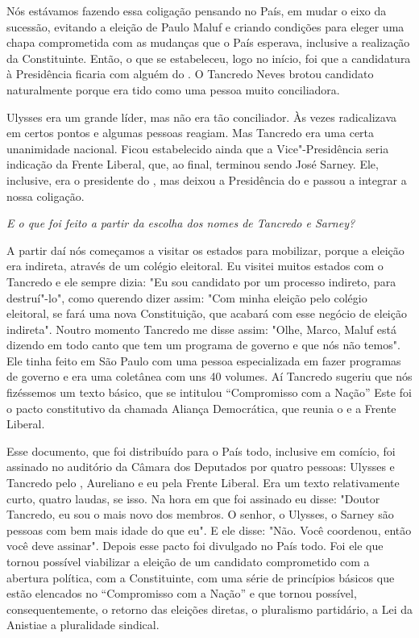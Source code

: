 Nós estávamos fazendo essa coligação pensando no País, em mudar o eixo
da sucessão, evitando a eleição de Paulo Maluf e criando condições para
eleger uma chapa comprometida com as mudanças que o País esperava,
inclusive a realização da Constituinte. Então, o que se estabeleceu,
logo no início, foi que a candidatura à Presidência ficaria com alguém
do . O Tancredo Neves brotou candidato naturalmente porque era tido
como uma pessoa muito conciliadora.

Ulysses era um grande líder, mas não era tão conciliador. Às vezes
radicalizava em certos pontos e algumas pessoas reagiam. Mas Tancredo
era uma certa unanimidade nacional. Ficou estabelecido ainda que a
Vice"-Presidência seria indicação da Frente Liberal, que, ao final,
terminou sendo José Sarney. Ele, inclusive, era o presidente do , mas
deixou a Presidência do  e passou a integrar a nossa coligação.

\medskip

\emph{E o que foi feito a partir da escolha dos nomes de Tancredo e
Sarney? }

A partir daí nós começamos a visitar os estados para
mobilizar, porque a eleição era indireta, através de um colégio
eleitoral. Eu visitei muitos estados com o Tancredo e ele sempre dizia:
"Eu sou candidato por um processo indireto, para destruí"-lo", como
querendo dizer assim: "Com minha eleição pelo colégio eleitoral, se fará
uma nova Constituição, que acabará com esse negócio de eleição
indireta". Noutro momento Tancredo me disse assim: "Olhe, Marco, Maluf
está dizendo em todo canto que tem um programa de governo e que nós não
temos". Ele tinha feito em São Paulo com uma pessoa especializada em
fazer programas de governo e era uma coletânea com uns 40 volumes. Aí
Tancredo sugeriu que nós fizéssemos um texto básico, que se intitulou
``Compromisso com a Nação'' Este foi o pacto constitutivo da chamada
Aliança Democrática, que reunia o  e a Frente Liberal.

Esse documento, que foi distribuído para o País todo, inclusive em
comício, foi assinado no auditório da Câmara dos Deputados por quatro
pessoas: Ulysses e Tancredo pelo , Aureliano e eu pela Frente
Liberal. Era um texto relativamente curto, quatro laudas, se isso. Na
hora em que foi assinado eu disse: "Doutor Tancredo, eu sou o mais novo
dos membros. O senhor, o Ulysses, o Sarney são pessoas com bem mais
idade do que eu". E ele disse: "Não. Você coordenou, então você deve
assinar". Depois esse pacto foi divulgado no País todo. Foi ele que
tornou possível viabilizar a eleição de um candidato comprometido com a
abertura política, com a Constituinte, com uma série de princípios
básicos que estão elencados no ``Compromisso com a Nação'' e que tornou
possível, consequentemente, o retorno das eleições diretas, o pluralismo
partidário, a Lei da Anistiae a pluralidade sindical.


